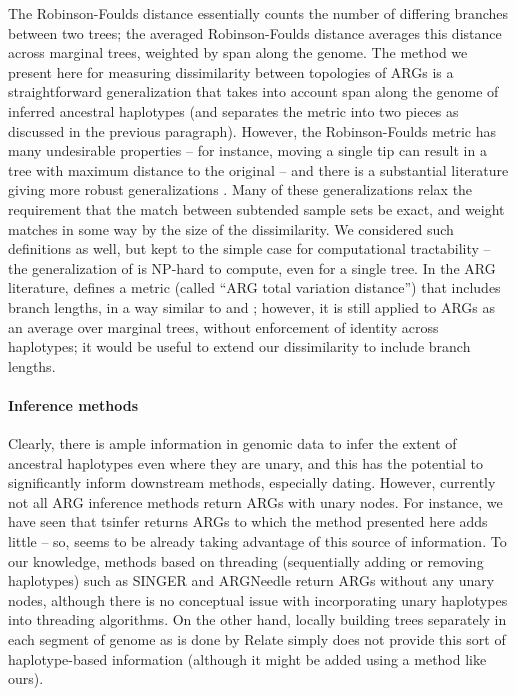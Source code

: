 \documentclass[10pt,twoside,lineno]{gsajnl}
\begin{document}
The Robinson-Foulds distance \citep{robinson1981comparison}
essentially counts the number of differing branches between two trees;
the averaged Robinson-Foulds distance \citep{kelleher2019inferring} %
averages this distance across marginal trees, weighted by span along the genome.
The method we present here for measuring dissimilarity between topologies of ARGs
is a straightforward generalization
that takes into account span along the genome of inferred ancestral haplotypes
(and separates the metric into two pieces as discussed in the previous paragraph).
However, the Robinson-Foulds metric has many undesirable properties --
for instance, moving a single tip can result in a tree with maximum distance to the original --
and there is a substantial literature giving more robust generalizations
\citep[reviewed by][]{llabres2021generalized}.
Many of these generalizations \citep[e.g.,][]{bocker2013generalized}
relax the requirement that the match between subtended sample sets be exact,
and weight matches in some way by the size of the dissimilarity.
We considered such definitions as well, but kept to the simple case
for computational tractability --
the generalization of \citet{bocker2013generalized} is NP-hard to compute, even for a single tree.
In the ARG literature, \citet{zhang2023biobankscale}
defines a metric (called ``ARG total variation distance'') that includes branch lengths,
in a way similar to \citet{robinson1979comparison} and \citet{kuhner1994simulation};
however, it is still applied to ARGs as an average over marginal trees,
without enforcement of identity across haplotypes;
it would be useful to extend our dissimilarity to include branch lengths.

\paragraph{Inference methods}
Clearly, there is ample information in genomic data to infer the extent of ancestral haplotypes even where they are unary,
and this has the potential to significantly inform downstream methods, especially dating.
However, currently not all ARG inference methods return ARGs with unary nodes.
For instance, we have seen that tsinfer returns ARGs to which the method presented here adds little --
so, seems to be already taking advantage of this source of information.
To our knowledge, methods based on threading (sequentially adding or removing haplotypes) such as
SINGER \cite{deng2024robust} and ARGNeedle \cite{zhang2023biobankscale} return ARGs without any unary nodes,
although there is no conceptual issue with incorporating unary haplotypes into threading algorithms.
On the other hand, locally building trees separately in each segment of genome as is done by Relate \cite{speidel2019method}
simply does not provide this sort of haplotype-based information (although it might be added using a method like ours).
\end{document}
